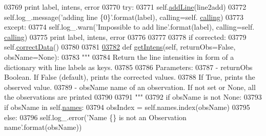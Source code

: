 \begin{DoxyCode}
{{{{{{{{{{{{{{{{{{{{{{03769                         \textcolor{keywordflow}{print} label, intens, error 
03770                     \textcolor{keywordflow}{try}:
03771                         self.\hyperlink{classpyneb_1_1core_1_1pynebcore_1_1_observation_a5f4b01dbeb8d50963fb7fa21b94bfc17}{addLine}(line2add)
03772                         self.log\_.message(\textcolor{stringliteral}{'adding line \{0\}'}.format(label), calling=self.
      \hyperlink{classpyneb_1_1core_1_1pynebcore_1_1_observation_a2639fad9af4fefad20e4097295bd40e7}{calling})
03773                     \textcolor{keywordflow}{except}:
03774                         self.log\_.warn(\textcolor{stringliteral}{'Impossible to add line'}.format(label), calling=self.
      \hyperlink{classpyneb_1_1core_1_1pynebcore_1_1_observation_a2639fad9af4fefad20e4097295bd40e7}{calling})
03775                         \textcolor{keywordflow}{print} label, intens, error
03776         
03777             
03778         \textcolor{keywordflow}{if} corrected:
03779             self.\hyperlink{classpyneb_1_1core_1_1pynebcore_1_1_observation_a823a1fa51f042f2734cbc323c6a7d4bb}{correctData}()
03780             
03781             
\hypertarget{pynebcore_8py_source_l03782}{}\hyperlink{classpyneb_1_1core_1_1pynebcore_1_1_observation_ac380b22660411926b90f935f5123494b}{03782}     \textcolor{keyword}{def }\hyperlink{classpyneb_1_1core_1_1pynebcore_1_1_observation_ac380b22660411926b90f935f5123494b}{getIntens}(self, returnObs=False, obsName=None):
03783         \textcolor{stringliteral}{"""}
03784 \textcolor{stringliteral}{        Return the line intensities in form of a dictionary with line labels as keys.}
03785 \textcolor{stringliteral}{        }
03786 \textcolor{stringliteral}{        Parameters:}
03787 \textcolor{stringliteral}{            - returnObs  Boolean. If False (default), prints the corrected values. }
03788 \textcolor{stringliteral}{                            If True, prints the observed value. }
03789 \textcolor{stringliteral}{            - obsName    name of an observation. If not set or None, all the observations are printed}
03790 \textcolor{stringliteral}{}
03791 \textcolor{stringliteral}{        """}
03792         \textcolor{keywordflow}{if} obsName \textcolor{keywordflow}{is} \textcolor{keywordflow}{not} \textcolor{keywordtype}{None}:
03793             \textcolor{keywordflow}{if} obsName \textcolor{keywordflow}{in} self.\hyperlink{classpyneb_1_1core_1_1pynebcore_1_1_observation_a3f365d0b1488b2eba300bf71caf23c17}{names}:
03794                 obsIndex = self.names.index(obsName)
03795             \textcolor{keywordflow}{else}:
03796                 self.log\_.error(\textcolor{stringliteral}{'Name \{\} is not an Observation name'}.format(obsName))
}}}}}}}}}}}}}}}}}}}}}}
\end{DoxyCode}
